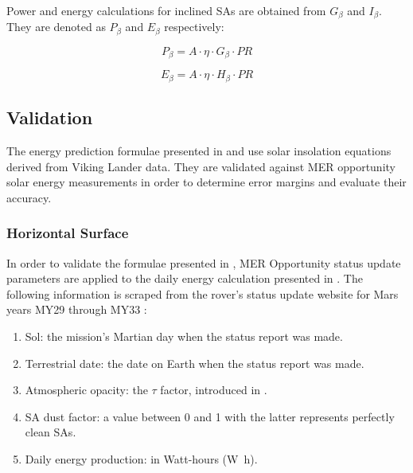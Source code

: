 Power and energy calculations for inclined \acp{SA} are obtained from $G_{\beta}$ and $I_{\beta}$. They are denoted as $P_{\beta}$ and $E_{\beta}$ respectively:

\begin{equation}
  \label{eq:SA_slope_power}
  P_{\beta} = A \cdot \eta \cdot G_{\beta} \cdot PR
\end{equation}


\begin{equation}
  \label{eq:SA_slope_energy}
  E_{\beta} = A \cdot \eta \cdot H_{\beta} \cdot PR
\end{equation}

\subsection{Validation}
\label{sec:PowerAndEnergyPredictions:Validation}
The energy prediction formulae presented in  and  use solar insolation equations derived from Viking Lander data. They are validated against \ac{MER} opportunity solar energy measurements in order to determine error margins and evaluate their accuracy.

\subsubsection{Horizontal Surface}
\label{sec:PowerAndEnergyPredictions:Validation:HorizontalSurface}

In order to validate the formulae presented in , \ac{MER} Opportunity status update parameters are applied to the daily energy calculation presented in . The following information is scraped from the rover's status update website for Mars years \ac{MY}29 through \ac{MY}33  :

\begin{enumerate}[label=\textcolor{BulletBlue}{(\alph*)}]
  \item Sol: the mission's Martian day when the status report was made.
  \item Terrestrial date: the date on Earth when the status report was made.
  \item Atmospheric opacity: the $\tau$ factor, introduced in  .
  \item \ac{SA} dust factor: a value between 0 and 1 with the latter represents perfectly clean \acp{SA}.
  \item Daily energy production: in Watt-hours (\si{\watt\hour}).
\end{enumerate}

